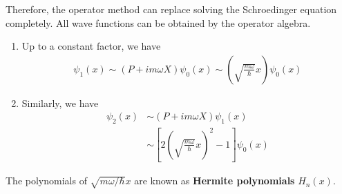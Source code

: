 Therefore, the operator method can replace solving the Schroedinger equation completely. All wave functions can be obtained by the operator algebra. 
\begin{enumerate}
    \item Up to a constant factor, we have
    \begin{align*}
        \psi_1(x)\sim (P+im\omega X)\psi_0(x)\sim\left( \sqrt{\frac{m\omega}{\hbar}}x \right) \psi_0(x)
    \end{align*}
    \item Similarly, we have
    \begin{align*}
        \psi_2(x)&\sim (P+im\omega X)\psi_1(x)\\
        &\sim \left[ 2 \left( \sqrt{\frac{m\omega}{\hbar}}x \right)^2 -1 \right]\psi_0(x)
    \end{align*}
\end{enumerate}

The polynomials of $\sqrt{m\omega/\hbar }x$ are known as \textbf{Hermite polynomials} $H_n(x )$.